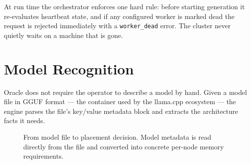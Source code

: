 \documentclass[11pt,a4paper]{article}
\begin{document}
At run time the orchestrator enforces one hard rule: before starting generation
it re-evaluates heartbeat state, and if any configured worker is marked dead the
request is rejected immediately with a \texttt{worker\_dead} error. The cluster
never quietly waits on a machine that is gone.

\section{Model Recognition}

Oracle does not require the operator to describe a model by hand. Given a model
file in GGUF format --- the container used by the llama.cpp ecosystem --- the
engine parses the file's key/value metadata block and extracts the architecture
facts it needs.

\begin{figure}[h]
\centering
{}
\caption{From model file to placement decision. Model metadata is read directly
from the file and converted into concrete per-node memory requirements.}
\label{fig:modelrec}
\end{figure}
\end{document}
